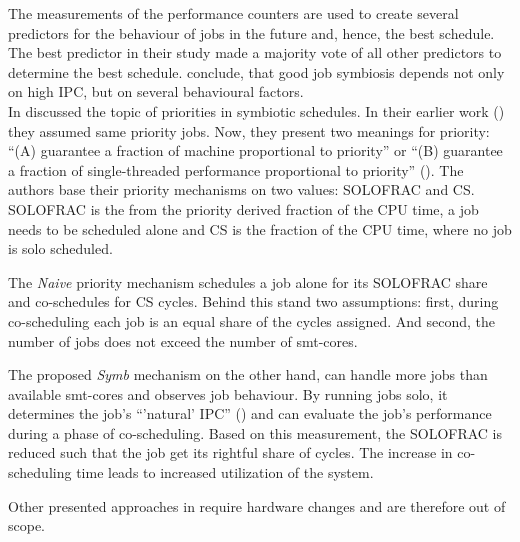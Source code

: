 The measurements of the performance counters are used to create several
predictors for the behaviour of jobs in the future and, hence, the best schedule.
The best predictor in their study made a majority vote of all other predictors
to determine the best schedule.
\citeauthor{snavely_symbiotic_2000} conclude, that good job symbiosis depends
not only on high IPC, but on several behavioural factors.
\\


In \citeyear{snavely_symbiotic_2002} \citeauthor{snavely_symbiotic_2002}
discussed the topic of priorities in symbiotic schedules.
In their earlier work (\cite{snavely_symbiotic_2000}) they assumed same
priority jobs.
Now, they present two meanings for priority: ``(A) guarantee a fraction of
machine proportional to priority'' or ``(B) guarantee a fraction of
single-threaded performance proportional to priority''
(\autocite[70]{snavely_symbiotic_2002}).
The authors base their priority mechanisms on two values: SOLOFRAC and CS.
SOLOFRAC is the from the priority derived fraction of the CPU time,
a job needs to be scheduled alone  and CS is the fraction of the CPU time,
where no job is solo scheduled.

The \textit{Naive} priority mechanism schedules a job alone for its SOLOFRAC
share and co-schedules for CS cycles. Behind this stand two assumptions: first,
during co-scheduling each job is an equal share of the cycles assigned.
And second, the number of jobs does not exceed the number of \gls{smt}-cores.

The proposed \textit{Symb} mechanism on the other hand, can handle more jobs
than available \gls{smt}-cores and observes job behaviour. By running jobs
solo, it determines the job's ``'natural' IPC''
(\autocite[71]{snavely_symbiotic_2002})
and can evaluate the job's performance during a phase of co-scheduling.
Based on this measurement, the SOLOFRAC is reduced such that the job get its
rightful share of cycles. The increase in co-scheduling time leads to increased
utilization of the system.

Other presented approaches in \cite{snavely_symbiotic_2002} require hardware
changes and are therefore out of scope.



